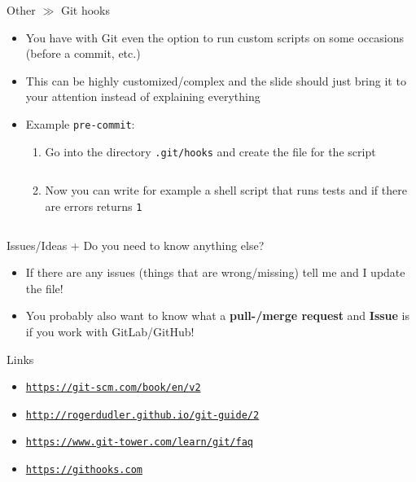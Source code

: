 \documentclass[10pt]{beamer}
\newcommand{\urlCustom}[1]{\href{https://#1}{\textcolor{greyCustom}{\texttt{#1}}}}
\begin{document}
\begin{frame}{Other $\gg$ Git hooks}
\begin{itemize}
	\item You have with Git even the option to run custom scripts on some occasions (before a commit, etc.)
	\item This can be highly customized/complex and the slide should just bring it to your attention instead of explaining everything
	\item Example \texttt{pre-commit}:
	\begin{enumerate}
		\item Go into the directory \texttt{.git/hooks} and create the file for the script
		\inputminted[bgcolor=lightGreyCustom,fontsize=\scriptsize]{sh}{./resources/git_hooks_01_create.sh}
		\item Now you can write for example a shell script that runs tests and if there are errors returns \texttt{1}
		\inputminted[bgcolor=lightGreyCustom,fontsize=\scriptsize]{sh}{./resources/git_hooks_02_example.sh}
	\end{enumerate}
\end{itemize}
\end{frame}

\begin{frame}{Issues/Ideas + Do you need to know anything else?}
\begin{itemize}
	\item If there are any issues (things that are wrong/missing) tell me and I update the file!
	\item You probably also want to know what a \textbf{pull-/merge request} and \textbf{Issue} is if you work with GitLab/GitHub!
\end{itemize}
\end{frame}

\begin{frame}{Links}
	\begin{itemize}
		\item\urlCustom{https://git-scm.com/book/en/v2}
		\item\urlCustom{http://rogerdudler.github.io/git-guide/2}
		\item\urlCustom{https://www.git-tower.com/learn/git/faq}
		\item\urlCustom{https://githooks.com}
	\end{itemize}
	\begin{center}\doclicenseThis\end{center}
\end{frame}
\end{document}
